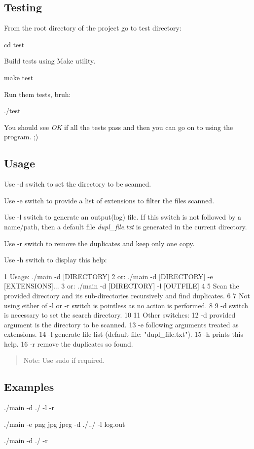 \subsection*{Testing}


\begin{DoxyEnumerate}
\item From the root directory of the project go to test directory\+:

{\ttfamily cd test}
\item Build tests using Make utility.

{\ttfamily make test}
\item Run them tests, bruh\+:

{\ttfamily ./test}
\end{DoxyEnumerate}

You should see {\itshape OK} if all the tests pass and then you can go on to using the program. ;)

\subsection*{\label{_use}%
Usage}


\begin{DoxyEnumerate}
\item Use {\ttfamily -\/d} switch to set the directory to be scanned.
\item Use {\ttfamily -\/e} switch to provide a list of extensions to filter the files scanned.
\item Use {\ttfamily -\/l} switch to generate an output(log) file. If this switch is not followed by a name/path, then a default file {\itshape dupl\+\_\+file.\+txt} is generated in the current directory.
\item Use {\ttfamily -\/r} switch to remove the duplicates and keep only one copy.
\item Use {\ttfamily -\/h} switch to display this help\+:
\end{DoxyEnumerate}


\begin{DoxyCode}
1 Usage: ./main -d [DIRECTORY]
2 or: ./main -d [DIRECTORY] -e [EXTENSIONS]...
3 or: ./main -d [DIRECTORY] -l [OUTFILE]
4 
5 Scan the provided directory and its sub-directories recursively and find duplicates.
6 
7 Not using either of -l or -r switch is pointless as no action is performed.
8 
9 -d switch is necessary to set the search directory.
10 
11 Other switches:
12     -d      provided argument is the directory to be scanned.
13     -e      following arguments treated as extensions.
14     -l      generate file list (default file: "dupl\_file.txt").
15     -h      prints this help.
16     -r      remove the duplicates so found.
\end{DoxyCode}
 \begin{quote}
Note\+: Use {\ttfamily sudo} if required. \end{quote}


\subsection*{Examples}


\begin{DoxyEnumerate}
\item {\ttfamily ./main -\/d ./ -\/l -\/r}
\item {\ttfamily ./main -\/e png jpg jpeg -\/d ./../ -\/l log.\+out}
\item {\ttfamily ./main -\/d ./ -\/r} 
\end{DoxyEnumerate}